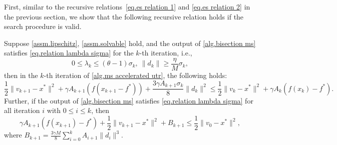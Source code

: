 \documentclass{article}
\begin{document}
First, similar to the recursive relations~\eqref{eq.es relation 1} and \eqref{eq.es relation 2} in the previous section, we show that the following recursive relation holds if the search procedure is valid.
\begin{lemma}\label{lem.ms estimate}
Suppose \autoref{assm.lipschitz}, \autoref{assm.solvable} hold, and the output of \autoref{alg.bisection ms} satisfies \eqref{eq.relation lambda sigma} for the $k$-th iteration, i.e.,
\begin{equation*}
    0\leq\lambda_k\leq (\theta-1)\sigma_k, \ \|d_k\|\geq \frac{\eta}{M}\sigma_k,
\end{equation*}
then in the $k$-th iteration of \autoref{alg.ms accelerated utr}, the following holds:
    \begin{equation}
        \label{eq.helper bounded x}
        \frac{1}{2}\|v_{k+1}-x^* \|^2 +\gamma A_{k+1}\left (f(x_{k+1}-f^*)\right)+ \frac{3\gamma A_{k+1}\sigma_k}{8}\|d_k\|^2 \leq \frac{1}{2}\|v_k-x^*\|^2 +\gamma A_k \left (f(x_k)-f^*\right).
    \end{equation}
    Further, if the output of \autoref{alg.bisection ms} satisfies \eqref{eq.relation lambda sigma} for all iteration $i$ with $0\leq i\leq k$, then
    \begin{equation}
        \label{eq.ms estimate advanced}
        \gamma A_{k+1}\left (f(x_{k+1})-f^* \right) + \frac{1}{2}\|v_{k+1}-x^*\|^2 +B_{k+1} \leq \frac{1}{2}\|v_0-x^*\|^2,
    \end{equation}
    where $B_{k+1} = \frac{3\gamma M}{8}\sum_{i=0}^{k}A_{i+1}\|d_i\|^3.$
\end{lemma}
\end{document}
